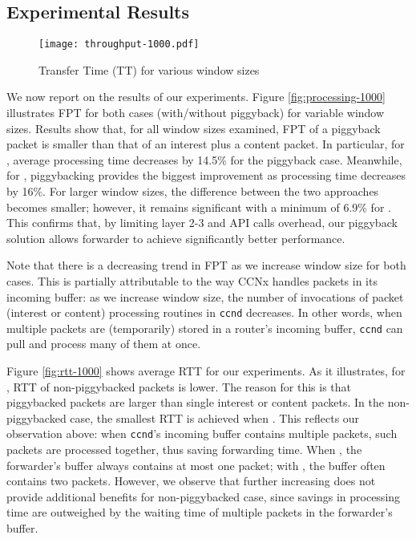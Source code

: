 \documentclass[conference]{IEEEtran}
\begin{document}
\subsection{Experimental Results}
\label{results}

\begin{figure*}[tb]
\centering
\texttt{[image: throughput-1000.pdf]}
\caption{Transfer Time (TT) for various window sizes}
\label{fig:throughput-1000}
\end{figure*}

We now report on the results of our experiments. 
Figure \ref{fig:processing-1000} illustrates FPT for both cases (with/without piggyback) 
for variable window sizes. Results show that, for all window sizes examined, FPT 
of a piggyback packet is smaller than that of an interest plus a content packet. In particular, 
for , average processing time decreases by 14.5\% for the piggyback case. Meanwhile,
for , piggybacking provides the biggest improvement as processing time decreases 
by 16\%. For larger window sizes, the difference between the two approaches becomes 
smaller; however, it remains significant with a minimum of 6.9\% for .
This confirms that, by limiting layer 2-3 and API calls overhead, our piggyback solution allows forwarder to achieve significantly better performance.

Note that there is a decreasing trend in FPT as we increase window size for 
both cases. This is partially attributable to the way CCNx handles packets in 
its incoming buffer: as we increase window size, the number of invocations of 
packet (interest or content) processing routines in \verb|ccnd| decreases. 
In other words, when multiple packets are (temporarily) stored in a router's 
incoming buffer, \verb|ccnd| can pull and process many of them at once.

Figure \ref{fig:rtt-1000} shows average RTT for our experiments. As it illustrates, 
for , RTT of non-piggybacked packets is lower. The reason for this is that 
piggybacked packets are larger than single interest or content packets.
In the non-piggybacked case, the smallest RTT is achieved when .  This reflects our 
observation above: when \verb|ccnd|'s incoming buffer contains multiple packets, such 
packets are processed together, thus saving forwarding time. When , the forwarder's 
buffer always contains at most one packet; with , the buffer often contains two packets. 
However, we observe that further increasing 
 does not provide additional benefits for non-piggybacked case, since savings in processing 
time are outweighed by the waiting time of multiple packets in the forwarder's buffer.
\end{document}
